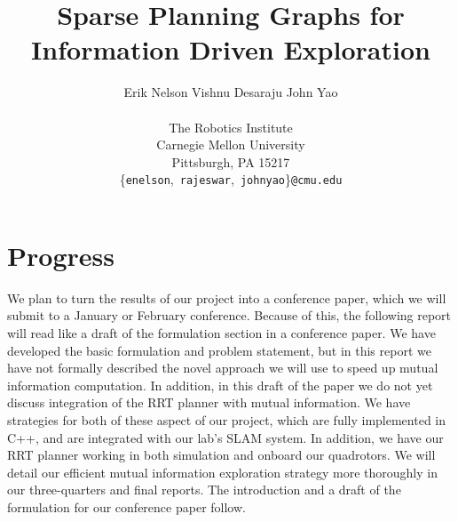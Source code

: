 \documentclass{article}
\begin{document}
\title{Sparse Planning Graphs for \\ Information Driven Exploration}


\date{}

\author{
  Erik Nelson \qquad Vishnu Desaraju \qquad John Yao \\
  \\
  \small The Robotics Institute \\
  \small Carnegie Mellon University \\
  \small Pittsburgh, PA 15217 \\
\small \{\texttt{enelson},\ \texttt{rajeswar},\ \texttt{johnyao}\}\texttt{@cmu.edu}}

\maketitle


\section{Progress}
We plan to turn the results of our project into a conference paper, which we will submit to a January or February conference. Because of this, the following report will read like a draft of the formulation section in a conference paper. We have developed the basic formulation and problem statement, but in this report we have not formally described the novel approach we will use to speed up mutual information computation. In addition, in this draft of the paper we do not yet discuss integration of the RRT planner with mutual information. We have strategies for both of these aspect of our project, which are fully implemented in C++, and are integrated with our lab's SLAM system. In addition, we have our RRT planner working in both simulation and onboard our quadrotors. We will detail our efficient mutual information exploration strategy more thoroughly in our three-quarters and final reports. The introduction and a draft of the formulation for our conference paper follow.








\end{document}
